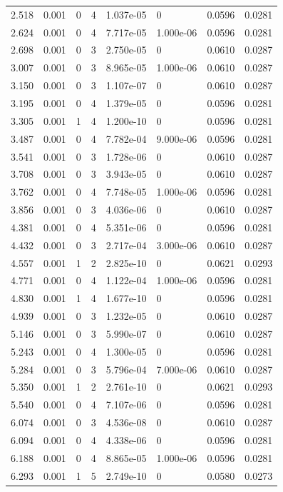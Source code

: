 \documentclass[preview]{standalone}
\begin{document}
{{\begin{tabular}{L{1.2cm}C{1.2cm} C{0.3cm}C{0.5cm} C{1.4cm}C{1.4cm} C{1.4cm}C{1.4cm}}
  2.518  &  0.001  & 0     &  4 &  1.037e-05  & 0  & 0.0596 &  0.0281   \\ 
  2.624  &  0.001  & 0     &  4 &  7.717e-05  & 1.000e-06  & 0.0596 &  0.0281   \\ 
  2.698  &  0.001  & 0     &  3 &  2.750e-05  & 0  & 0.0610 &  0.0287   \\ 
  3.007  &  0.001  & 0     &  3 &  8.965e-05  & 1.000e-06  & 0.0610 &  0.0287   \\ 
  3.150  &  0.001  & 0     &  3 &  1.107e-07  & 0  & 0.0610 &  0.0287   \\ 
  3.195  &  0.001  & 0     &  4 &  1.379e-05  & 0  & 0.0596 &  0.0281   \\ 
  3.305  &  0.001  & 1     &  4 &  1.200e-10  & 0  & 0.0596 &  0.0281   \\ 
  3.487  &  0.001  & 0     &  4 &  7.782e-04  & 9.000e-06  & 0.0596 &  0.0281   \\ 
  3.541  &  0.001  & 0     &  3 &  1.728e-06  & 0  & 0.0610 &  0.0287   \\ 
  3.708  &  0.001  & 0     &  3 &  3.943e-05  & 0  & 0.0610 &  0.0287   \\ 
  3.762  &  0.001  & 0     &  4 &  7.748e-05  & 1.000e-06  & 0.0596 &  0.0281   \\ 
  3.856  &  0.001  & 0     &  3 &  4.036e-06  & 0  & 0.0610 &  0.0287   \\ 
  4.381  &  0.001  & 0     &  4 &  5.351e-06  & 0  & 0.0596 &  0.0281   \\ 
  4.432  &  0.001  & 0     &  3 &  2.717e-04  & 3.000e-06  & 0.0610 &  0.0287   \\ 
  4.557  &  0.001  & 1     &  2 &  2.825e-10  & 0  & 0.0621 &  0.0293   \\ 
  4.771  &  0.001  & 0     &  4 &  1.122e-04  & 1.000e-06  & 0.0596 &  0.0281   \\ 
  4.830  &  0.001  & 1     &  4 &  1.677e-10  & 0  & 0.0596 &  0.0281   \\ 
  4.939  &  0.001  & 0     &  3 &  1.232e-05  & 0  & 0.0610 &  0.0287   \\ 
  5.146  &  0.001  & 0     &  3 &  5.990e-07  & 0  & 0.0610 &  0.0287   \\ 
  5.243  &  0.001  & 0     &  4 &  1.300e-05  & 0  & 0.0596 &  0.0281   \\ 
  5.284  &  0.001  & 0     &  3 &  5.796e-04  & 7.000e-06  & 0.0610 &  0.0287   \\ 
  5.350  &  0.001  & 1     &  2 &  2.761e-10  & 0  & 0.0621 &  0.0293   \\ 
  5.540  &  0.001  & 0     &  4 &  7.107e-06  & 0  & 0.0596 &  0.0281   \\ 
  6.074  &  0.001  & 0     &  3 &  4.536e-08  & 0  & 0.0610 &  0.0287   \\ 
  6.094  &  0.001  & 0     &  4 &  4.338e-06  & 0  & 0.0596 &  0.0281   \\ 
  6.188  &  0.001  & 0     &  4 &  8.865e-05  & 1.000e-06  & 0.0596 &  0.0281   \\ 
  6.293  &  0.001  & 1     &  5 &  2.749e-10  & 0  & 0.0580 &  0.0273   \\ 
\hline 
\end{tabular} 

}}
\end{document}
